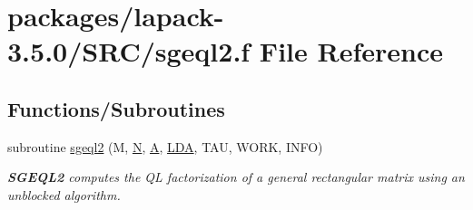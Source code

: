 \hypertarget{sgeql2_8f}{}\section{packages/lapack-\/3.5.0/\+S\+R\+C/sgeql2.f File Reference}
\label{sgeql2_8f}
\subsection*{Functions/\+Subroutines}
\begin{DoxyCompactItemize}
\item 
subroutine \hyperlink{group__realGEcomputational_ga242e34c6d75598ab3fdac21565a81099}{sgeql2} (M, \hyperlink{polmisc_8c_a0240ac851181b84ac374872dc5434ee4}{N}, \hyperlink{classA}{A}, \hyperlink{example__user_8c_ae946da542ce0db94dced19b2ecefd1aa}{L\+D\+A}, T\+A\+U, W\+O\+R\+K, I\+N\+F\+O)
\begin{DoxyCompactList}\small\item\em {\bfseries S\+G\+E\+Q\+L2} computes the Q\+L factorization of a general rectangular matrix using an unblocked algorithm. \end{DoxyCompactList}\end{DoxyCompactItemize}
